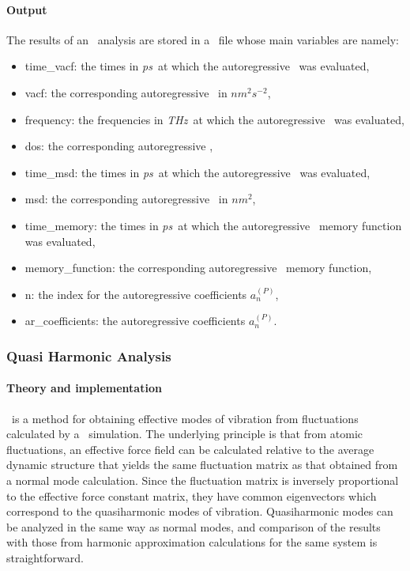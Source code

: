 \documentclass[a4paper,11pt]{report}
\newcommand{\nmsquare}{$nm^2$}
\newcommand{\vacfunits}{$nm^2s^{-2}$}
\newcommand{\ps}{\textit{ps}}
\newcommand{\thz}{\textit{THz}}
\begin{document}
\paragraph{Output\\}
The results of an \ARA\ analysis are stored in a \NetCDF\ file whose main variables are namely:
\begin{itemize}
\item time\_vacf: the times in \ps\ at which the autoregressive \VACF\ was evaluated,
\item vacf: the corresponding autoregressive \VACF\ in \vacfunits ,
\item frequency: the frequencies in \thz\ at which the autoregressive \DOS\ was evaluated,
\item dos: the corresponding autoregressive \DOS,
\item time\_msd: the times in \ps\ at which the autoregressive \MSD\ was evaluated,
\item msd: the corresponding autoregressive \MSD\ in \nmsquare ,
\item time\_memory: the times in \ps\ at which the autoregressive \VACF\ memory function was evaluated,
\item memory\_function: the corresponding autoregressive \VACF\ memory function,
\item n: the index for the autoregressive coefficients $a_n^{(P)}$,
\item ar\_coefficients: the autoregressive coefficients $a_n^{(P)}$.
\end{itemize}

\subsubsection{Quasi Harmonic Analysis}
\label{qha}
\paragraph{Theory and implementation\\}
\label{qha_theory}
\QHA\ is a method for obtaining effective modes of vibration from fluctuations calculated by a \MD\ 
simulation. The underlying principle is that from atomic fluctuations, an effective force field can be calculated 
relative to the average dynamic structure that yields the same fluctuation matrix as that obtained from a normal mode 
calculation. Since the fluctuation matrix is inversely proportional to the effective force constant matrix, they have common 
eigenvectors which correspond to the quasiharmonic modes of vibration. Quasiharmonic modes  can be analyzed in the same way 
as normal modes, and comparison of the results with those from harmonic approximation calculations for the same system is 
straightforward.
\end{document}
